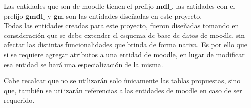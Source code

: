 


    Las entidades que son de moodle tienen el prefijo \(\textbf{mdl\_}\), las entidades con el prefijo
 \(\textbf{gmdl\_}\) y \(\textbf{gm}\) son las entidades diseñadas en este proyecto.\\

 \noindent Todas las entidades creadas para este proyecto, fueron diseñadas tomando en
 consideración que se debe extender el esquema de base de datos de moodle, sin afectar las distintas
 funcionalidades que brinda de forma nativa. Es por ello que si se requiere agregar atributos a una entidad de moodle, en lugar de modificar esa entidad se hará una especialización de la misma.

 \noindent Cabe recalcar que no se utilizarán solo únicamente las tablas propuestas, sino que, también se utilizarán referencias a las entidades de moodle en caso de ser requerido.


\newcommand{\schemeName}[1]{%
    \vspace{-1em}\hfill Nombre en el esquema: {\it #1}\ \ \par%
}

    

    
    
    
    
    
    






